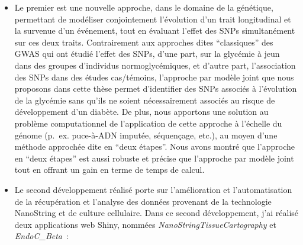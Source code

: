 \documentclass[11pt,a4paper,notrimn]{krantz}
\theoremstyle{definition}
\theoremstyle{definition}
\theoremstyle{remark}
\begin{document}
\begin{itemize}
\item
  Le premier est une nouvelle approche, dans le domaine de la génétique,
  permettant de modéliser conjointement l'évolution d'un trait
  longitudinal et la survenue d'un événement, tout en évaluant l'effet
  des SNPs simultanément sur ces deux traits. Contrairement aux
  approches dites ``classiques'' des GWAS qui ont étudié l'effet des
  SNPs, d'une part, sur la glycémie à jeun dans des groupes d'individus
  normoglycémiques, et d'autre part, l'association des SNPs dans des
  études cas/témoins, l'approche par modèle joint que nous proposons
  dans cette thèse permet d'identifier des SNPs associés à l'évolution
  de la glycémie sans qu'ils ne soient nécessairement associés au risque
  de développement d'un diabète. De plus, nous apportons une solution au
  problème computationnel de l'application de cette approche à l'échelle
  du génome (p.~ex. puce-à-ADN imputée, séquençage, etc.), au moyen
  d'une méthode approchée dite en ``deux étapes''. Nous avons montré que
  l'approche en ``deux étapes'' est aussi robuste et précise que
  l'approche par modèle joint tout en offrant un gain en terme de temps
  de calcul.
\item
  Le second développement réalisé porte sur l'amélioration et
  l'automatisation de la récupération et l'analyse des données provenant
  de la technologie NanoString et de culture cellulaire. Dans ce second
  développement, j'ai réalisé deux applications web Shiny, nommées
  \emph{NanoStringTissueCartography} et \emph{EndoC\_Beta}~:


\end{itemize}
\end{document}
